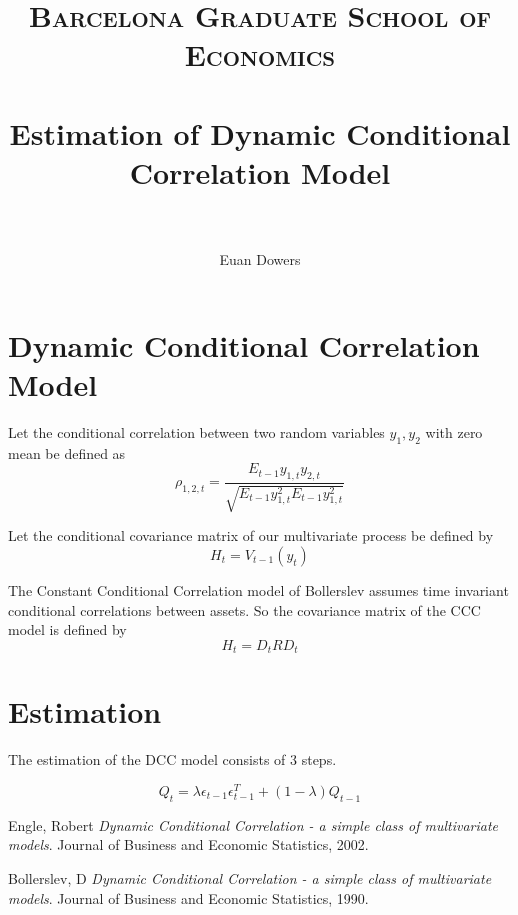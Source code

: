 \documentclass[paper=a4, fontsize=10pt]{scrartcl} %
\title{
\normalfont \normalsize
\textsc{Barcelona Graduate School of Economics} \\ [20pt] %
\horrule{0.5pt} \\[0.2cm] %
\Large Estimation of Dynamic Conditional Correlation Model \\ %
\horrule{0.5pt} \\[0.2cm] %
}
\author{Euan Dowers} %
\date{} %
\numberwithin{equation}{section} %
\numberwithin{figure}{section} %
\numberwithin{table}{section} %
\begin{document}
\maketitle %

\section{Dynamic Conditional Correlation Model}

Let the conditional correlation between two random variables $y_1, y_2$ with zero mean be defined as
\begin{equation}
\rho_{1,2,t} = \frac{E_{t-1}y_{1,t}y_{2,t}}{\sqrt{E_{t-1}y_{1,t}^2E_{t-1}y_{1,t}^2}}
\end{equation}

Let the conditional covariance matrix of our multivariate process be defined by
\begin{equation}
H_t = V_{t-1}(y_t)
\end{equation}

The Constant Conditional Correlation model of Bollerslev \cite{bollerslev90} assumes time invariant conditional correlations between assets. So the covariance matrix of the CCC model is defined by
\begin{equation}
H_t = D_t R D_t
\end{equation}

\section{Estimation}

The estimation of the DCC model consists of 3 steps.

\begin{equation}
Q_t = \lambda\epsilon_{t-1}\epsilon_{t-1}^T + (1-\lambda) Q_{t-1}
\end{equation}

\begin{thebibliography}{9}
Engle, Robert
\textit{Dynamic Conditional Correlation - a simple class of multivariate models}.
Journal of Business and Economic Statistics, 2002.

Bollerslev, D
\textit{Dynamic Conditional Correlation - a simple class of multivariate models}.
Journal of Business and Economic Statistics, 1990.
\end{thebibliography}
\end{document}
